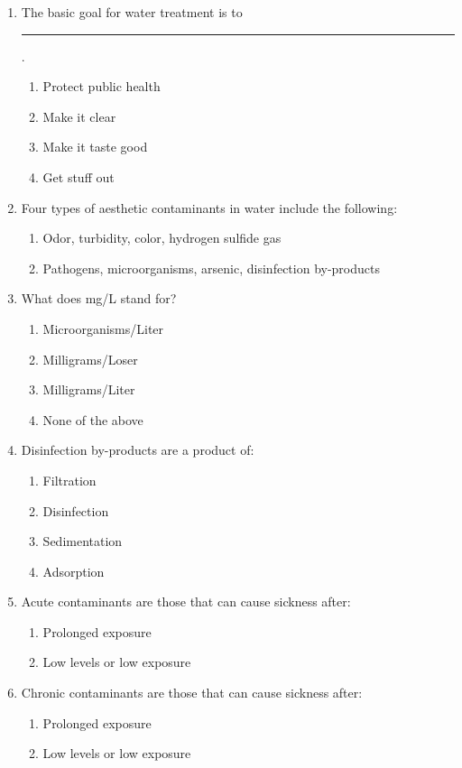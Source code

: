 \documentclass{article}
\begin{document}
\begin{enumerate}
\item The basic goal for water treatment is to \rule{1cm}{0.5pt}.
\begin{enumerate}
\item Protect public health
\item Make it clear
\item Make it taste good
\item Get stuff out
\end{enumerate}

\item Four types of aesthetic contaminants in water include the following:
\begin{enumerate}
\item Odor, turbidity, color, hydrogen sulfide gas
\item Pathogens, microorganisms, arsenic, disinfection by-products
\end{enumerate}

\item What does mg/L stand for?
\begin{enumerate}
\item Microorganisms/Liter
\item Milligrams/Loser
\item Milligrams/Liter
\item None of the above
\end{enumerate}

\item Disinfection by-products are a product of:
\begin{enumerate}
\item Filtration
\item Disinfection
\item Sedimentation
\item Adsorption
\end{enumerate}

\item Acute contaminants are those that can cause sickness after:
\begin{enumerate}
\item Prolonged exposure
\item Low levels or low exposure
\end{enumerate}

\item Chronic contaminants are those that can cause sickness after:
\begin{enumerate}
\item Prolonged exposure
\item Low levels or low exposure
\end{enumerate}


\end{enumerate}
\end{document}
